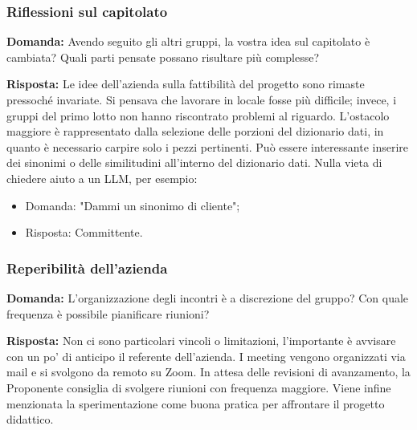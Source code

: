 \subsubsection{Riflessioni sul capitolato}
\textbf{Domanda:} Avendo seguito gli altri gruppi, la vostra idea sul capitolato è cambiata? Quali parti pensate possano risultare più complesse?

\textbf{Risposta:} Le idee dell’azienda sulla fattibilità del progetto sono rimaste pressoché invariate. Si pensava che lavorare in locale fosse più difficile; invece, i gruppi del primo lotto non hanno riscontrato problemi al riguardo. L’ostacolo maggiore è rappresentato dalla selezione delle porzioni del dizionario dati, in quanto è necessario carpire solo i pezzi pertinenti. Può essere interessante inserire dei sinonimi o delle similitudini all’interno del dizionario dati. Nulla vieta di chiedere aiuto a un LLM, per esempio:
	\begin{itemize}
		\item Domanda: "Dammi un sinonimo di cliente";
		\item Risposta: Committente.
	\end{itemize}

\subsubsection{Reperibilità dell'azienda}
\textbf{Domanda:} L'organizzazione degli incontri è a discrezione del gruppo? Con quale frequenza è possibile pianificare riunioni?

\textbf{Risposta:} Non ci sono particolari vincoli o limitazioni, l’importante è avvisare con un po’ di anticipo il referente dell’azienda. I meeting vengono organizzati via mail e si svolgono da remoto su Zoom. In attesa delle revisioni di avanzamento, la Proponente consiglia di svolgere riunioni con frequenza maggiore. Viene infine menzionata la sperimentazione come buona pratica per affrontare il progetto didattico.